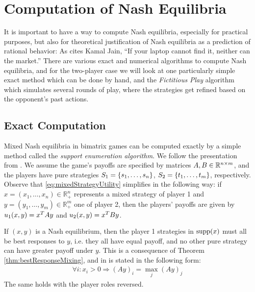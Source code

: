 \documentclass[a4paper]{scrreprt}
\newcommand{\Rp}{\mathbb{R}_+}
\begin{document}
    
    \section{Computation of Nash Equilibria}
    It is important to have a way to compute Nash equilibria, especially for practical purposes, but also for theoretical justification of Nash equilibria as a prediction of rational behavior: As \cite[p.30]{bib:nisanAlgorithmicGameTheoryCh2ComplexityNash} cites Kamal Jain, “If your laptop cannot
find it, neither can the market.” There are various exact and numerical algorithms to compute Nash equilibria, and for the two-player case we will look at one particularly simple exact method which can be done by hand, and the \emph{Fictitious Play} algorithm which simulates several rounds of play, where the strategies get refined based on the opponent's past actions.
    
    \subsection{Exact Computation}
    Mixed Nash equilibria in bimatrix games can be computed exactly by a simple method called the \emph{support enumeration algorithm}.
    We follow the presentation from \cite{bib:nisanAlgorithmicGameTheoryCh3EquilibriumComputation}.
    We assume the game's payoffs are specified by matrices $A, B \in \mathbb{R}^{n\times m}$, and the players have pure strategies $S_1 = \{s_1,\dots,s_n\}$, $S_2 = \{t_1,\dots,t_m\}$, respectively.
    Observe that \eqref{eq:mixedStrategyUtility} simplifies in the following way: if $x = (x_1,\dots,x_n) \in \Rp^n$ represents a mixed strategy of player 1 and $y = (y_1,\dots,y_m) \in \Rp^m$ one of player 2, then the players' payoffs are given by $u_1(x,y) = x^{T} A y$ and $u_2(x,y) = x^{T} B y$. 
    
    If $(x, y)$ is a Nash equilibrium, then the player 1 strategies in $\operatorname{supp}(x)$ must all be best responses to $y$, i.e. they all have equal payoff, and no other pure strategy can have greater payoff under $y$. This is a consequence of Theorem \ref{thm:bestResponseMixing}, and in \cite[p.55]{bib:nisanAlgorithmicGameTheoryCh3EquilibriumComputation} is stated in the following form:
    \begin{gather}
        \forall i: x_i > 0 \Rightarrow (Ay)_i = \max_{j} (Ay)_j
        \label{eq:equalMaxPureStrategyPayoffsLinearSystem}
    \end{gather}
    The same holds with the player roles reversed.
    
\end{document}
